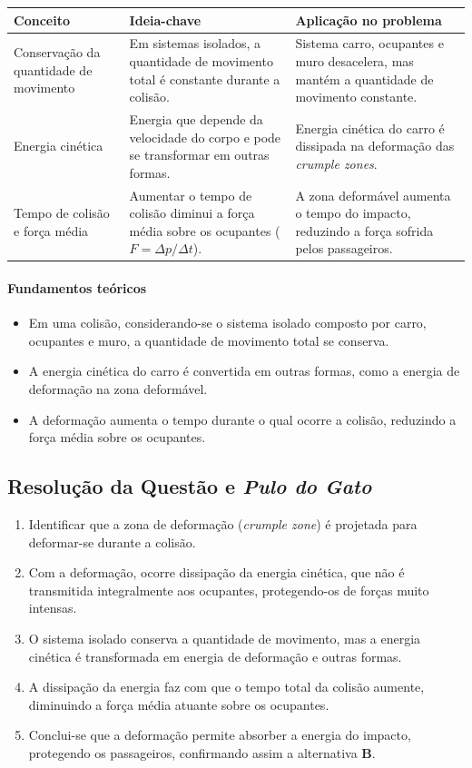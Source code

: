 \documentclass{article}
\begin{document}
\begin{tabular}{|p{5cm}|p{6cm}|p{6cm}|}
\hline
\textbf{Conceito} & \textbf{Ideia-chave} & \textbf{Aplicação no problema} \\
\hline
Conservação da quantidade de movimento & Em sistemas isolados, a quantidade de movimento total é constante durante a colisão. & Sistema carro, ocupantes e muro desacelera, mas mantém a quantidade de movimento constante. \\
\hline
Energia cinética & Energia que depende da velocidade do corpo e pode se transformar em outras formas. & Energia cinética do carro é dissipada na deformação das \emph{crumple zones}. \\
\hline
Tempo de colisão e força média & Aumentar o tempo de colisão diminui a força média sobre os ocupantes (\(F = \Delta p/\Delta t\)). & A zona deformável aumenta o tempo do impacto, reduzindo a força sofrida pelos passageiros. \\
\hline
\end{tabular}

\bigskip

\paragraph{Fundamentos teóricos}
\begin{itemize}
  \item Em uma colisão, considerando-se o sistema isolado composto por carro, ocupantes e muro, a quantidade de movimento total se conserva.
  \item A energia cinética do carro é convertida em outras formas, como a energia de deformação na zona deformável.
  \item A deformação aumenta o tempo durante o qual ocorre a colisão, reduzindo a força média sobre os ocupantes.
\end{itemize}

\bigskip

\subsection*{Resolução da Questão e \emph{Pulo do Gato}}

\begin{enumerate}
  \item Identificar que a zona de deformação (\emph{crumple zone}) é projetada para deformar-se durante a colisão.
  \item Com a deformação, ocorre dissipação da energia cinética, que não é transmitida integralmente aos ocupantes, protegendo-os de forças muito intensas.
  \item O sistema isolado conserva a quantidade de movimento, mas a energia cinética é transformada em energia de deformação e outras formas.
  \item A dissipação da energia faz com que o tempo total da colisão aumente, diminuindo a força média atuante sobre os ocupantes.
  \item Conclui-se que a deformação permite absorber a energia do impacto, protegendo os passageiros, confirmando assim a alternativa \textbf{B}.
\end{enumerate}
\end{document}
